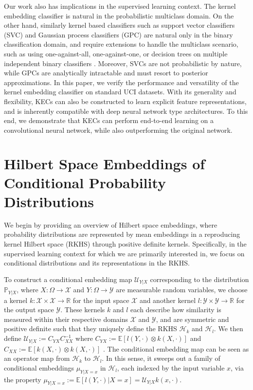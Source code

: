 \documentclass{article}
\begin{document}
	Our work also has implications in the supervised learning context. The kernel embedding classifier is natural in the probabilistic multiclass domain. On the other hand, similarly kernel based classifiers such as support vector classifiers (SVC) \citep{m2001introduction} and Gaussian process classifiers (GPC) \citep{rasmussen2006gaussian} are natural only in the binary classification domain, and require extensions to handle the multiclass scenario, such as using one-against-all, one-against-one, or decision trees on multiple independent binary classifiers \citep{aly2005survey, hsu2002comparison}. Moreover, SVCs are not probabilistic by nature, while GPCs are analytically intractable and must resort to posterior approximations. In this paper, we verify the performance and versatility of the kernel embedding classifier on standard UCI datasets. With its generality and flexibility, KECs can also be constructed to learn explicit feature representations, and is inherently compatible with deep neural network type architectures. To this end, we demonstrate that KECs can perform end-to-end learning on a convolutional neural network, while also outperforming the original network.

\section{Hilbert Space Embeddings of Conditional Probability Distributions}
\label{sec:background}

	We begin by providing an overview of Hilbert space embeddings, where probability distributions are represented by mean embeddings in a reproducing kernel Hilbert space (RKHS) through positive definite kernels. Specifically, in the supervised learning context for which we are primarily interested in, we focus on conditional distributions and its representations in the RKHS.
	
	To construct a conditional embedding map $\mathcal{U}_{Y | X}$ corresponding to the distribution $\mathbb{P}_{Y | X}$, where $X : \Omega \to \mathcal{X}$ and $Y: \Omega \to \mathcal{Y}$ are measurable random variables, we choose a kernel $k : \mathcal{X} \times \mathcal{X} \to \mathbb{R}$ for the input space $\mathcal{X}$ and another kernel $l : \mathcal{Y} \times \mathcal{Y} \to \mathbb{R}$ for the output space $\mathcal{Y}$. These kernels $k$ and $l$ each describe how similarity is measured within their respective domains $\mathcal{X}$ and $\mathcal{Y}$, and are symmetric and positive definite such that they uniquely define the RKHS $\mathcal{H}_{k}$ and $\mathcal{H}_{l}$. We then define $\mathcal{U}_{Y | X} := C_{YX} C_{XX}^{-1}$ where $C_{YX} := \mathbb{E}[l(Y, \cdot) \otimes k(X, \cdot)]$ and $C_{XX} := \mathbb{E}[k(X, \cdot) \otimes k(X, \cdot)]$ \citep{song2009hilbert}. The conditional embedding map can be seen as an operator map from $\mathcal{H}_{k}$ to $\mathcal{H}_{l}$. In this sense, it sweeps out a family of conditional embeddings $\mu_{Y | X = x}$ in $\mathcal{H}_{l}$, each indexed by the input variable $x$, via the property $\mu_{Y | X = x} := \mathbb{E}[l(Y, \cdot) | X = x] = \mathcal{U}_{Y | X} k(x, \cdot)$.
	
\end{document}
